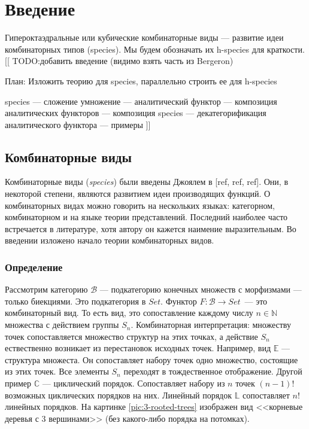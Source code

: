 \section{Введение}

Гипероктаэдральные или кубические комбинаторные виды --- развитие идеи
комбинаторных типов (species).
Мы будем обозначать их h-species для краткости.
[[
TODO:добавить введение (видимо взять часть из Bergeron)

План:
Изложить теорию для species, параллельно строить ее для h-species

species --- сложение умножение --- аналитический функтор --- композиция
аналитических функторов --- композиция species --- декатегорификация
аналитического функтора --- примеры
]]

\subsection{Комбинаторные виды}
Комбинаторные виды (\emph{species}) были введены Джоялем в [ref, ref, ref].
Они, в некоторой степени, являются развитием идеи производящих функций.
О комбинаторных видах можно говорить на нескольких языках: категорном,
комбинаторном и на языке теории представлений. Последний наиболее часто
встречается в литературе, хотя автору он кажется наимение выразительным.
Во введении изложено начало теории комбинаторных видов.
\subsubsection{Определение}
Рассмотрим категорию $\mathcal B$ --- подкатегорию конечных множеств с
морфизмами --- только биекциями. Это подкатегория в $Set$. Функтор
$F:\mathcal B \rightarrow Set$~--- это комбинаторный вид. То есть вид, это
сопоставление каждому числу $n \in \mathbb N$ множества с действием группы
$S_n$. Комбинаторная интерпретация: множеству точек сопоставляется
множество структур на этих точках, а действие $S_n$ ествественно возникает из
перестановок исходных точек. Например, вид $\mathbb E$ --- структура множеста. Он
сопоставляет набору точек одно множество, состоящие из этих точек. Все элементы $S_n$
переходят в тождественное отображение. Другой пример $\mathbb C$ --- циклический
порядок. Сопоставляет набору из $n$ точек $(n-1)!$ возможных циклических
порядков на них. Линейный порядок $\mathbb L$ сопоставляет $n!$ линейных
порядков. На картинке \ref{pic:3-rooted-trees} изображен вид <<корневые
деревья с 3 вершинами>> (без какого-либо порядка на потомках).

